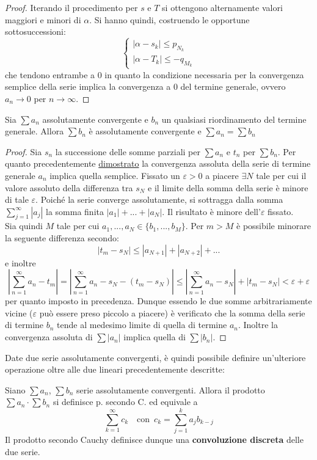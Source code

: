 \documentclass[10pt]{article}
\theoremstyle{plain}
\begin{document}
\begin{proof}
    Iterando il procedimento per $s$ e $T$ si ottengono alternamente valori maggiori e minori di $\alpha$. Si hanno quindi, costruendo le opportune sottosuccessioni:
    \[\begin{cases}
        |\alpha - s_k| \leq p_{N_k}\\
        |\alpha - T_k| \leq -q_{M_k}
    \end{cases}\]
    che tendono entrambe a 0 in quanto la condizione necessaria per la convergenza semplice della serie implica la convergenza a 0 del termine generale, ovvero $a_n \rightarrow 0$ per $n \rightarrow \infty$.
\end{proof}

\begin{ther}
    Sia $\sum a_n$ assolutamente convergente e $b_n$ un qualsiasi riordinamento del termine generale. Allora $\sum b_n$ è assolutamente convergente e $\sum a_n = \sum b_n$
\end{ther}
\begin{proof}
    Sia $s_n$ la successione delle somme parziali per $\sum a_n$ e $t_n$ per $\sum b_n$. Per quanto precedentemente \hyperlink{assolutamente}{dimostrato} la convergenza assoluta della serie di termine generale $a_n$ implica quella semplice. Fissato un $\varepsilon > 0$ a piacere $\exists N$ tale per cui il valore assoluto della differenza tra $s_N$ e il limite della somma della serie è minore di tale $\varepsilon$. Poiché la serie converge assolutamente, si sottragga dalla somma $\sum_{j=1}^\infty |a_j|$ la somma finita $|a_1| + ... + |a_N|$. Il risultato è minore dell'$\varepsilon$ fissato.
    \\Sia quindi $M$ tale per cui $a_1, ..., a_N \in \{b_1, ..., b_M\}$. Per $m > M$ è possibile minorare la seguente differenza secondo:
    \[|t_m - s_N| \leq |a_{N+1}| + |a_{N+2}| + ...\]
    e inoltre
    \[|\sum \limits_{n=1}^{\infty}a_n - t_m| = |\sum \limits_{n=1}^{\infty}a_n - s_N - (t_m - s_N)| \leq |\sum \limits_{n=1}^{\infty}a_n - s_N| + |t_m - s_N| < \varepsilon + \varepsilon\]
    per quanto imposto in precedenza. Dunque essendo le due somme arbitrariamente vicine ($\varepsilon$ può essere preso piccolo a piacere) è verificato che la somma della serie di termine $b_n$ tende al medesimo limite di quella di termine $a_n$. Inoltre la convergenza assoluta di $\sum |a_n|$ implica quella di $\sum |b_n|$.
\end{proof}

Date due serie assolutamente convergenti, è quindi possibile definire un'ulteriore operazione oltre alle due lineari precedentemente descritte:
\begin{defin}
Siano $\sum a_n$, $\sum b_n$ serie assolutamente convergenti. Allora il prodotto $\sum a_n \cdot \sum b_n$ si definisce p. secondo C. ed equivale a 
\[\sum\limits_{k=1}^{\infty} c_k \quad \textrm{con} \enspace c_k = \sum\limits_{j=1}^{k} a_j b_{k - j}\]
Il prodotto secondo Cauchy definisce dunque una \textbf{convoluzione discreta} delle due serie.
\end{defin}
\end{document}
